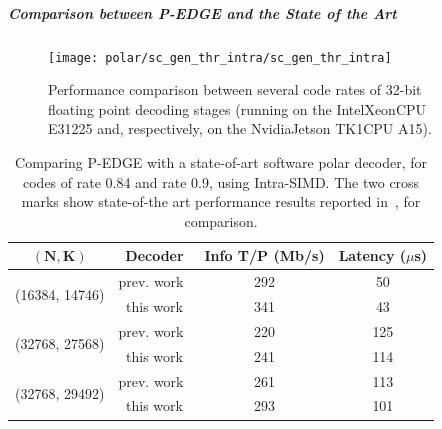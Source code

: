 \subparagraph{Comparison between P-EDGE and the State of the Art}

\begin{figure}[htp]
  \texttt{[image: polar/sc\_gen\_thr\_intra/sc\_gen\_thr\_intra]}
  \caption{Performance comparison between several code rates of 32-bit floating
    point decoding stages (running on the Intel\R Xeon\TM CPU E31225 and,
    respectively, on the Nvidia\R Jetson TK1\TM CPU A15).}
  \label{plot:polar_sc_gen_thr_intra}
\end{figure}

\begin{table}
  \begin{center}
  \begin{tabular}{c | c  c  c}
    $\bm{(N, K)}$                   & \textbf{Decoder}             & \textbf{Info T/P} (Mb/s) & \textbf{Latency} ($\mu$s)\\
    \hline
    \hline
    \multirow{2}{*}{(16384, 14746)} & prev. work~\cite{Sarkis2014} & 292                      & 50              \\
                                    & this work                    & 341                      & 43              \\
    \hline
    \multirow{2}{*}{(32768, 27568)} & prev. work~\cite{Sarkis2014} & 220                      & 125             \\
                                    & this work                    & 241                      & 114             \\
    \hline
    \multirow{2}{*}{(32768, 29492)} & prev. work~\cite{Sarkis2014} & 261                      & 113             \\
                                    & this work                    & 293                      & 101             \\
  \end{tabular}
  \end{center}
  \caption{Comparing P-EDGE with a state-of-art software polar decoder, for
    codes of rate 0.84 and rate 0.9, using Intra-SIMD. The two cross marks show
    state-of-the art performance results reported in~\cite{Sarkis2014}, for
    comparison.}
  \label{tab:polar_sc_gen_thr_comparison}
\end{table}

